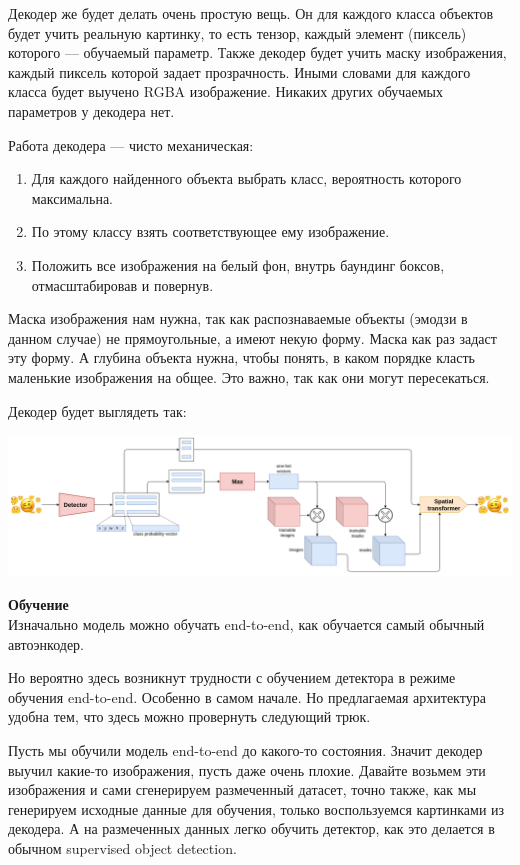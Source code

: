 \documentclass[12pt]{article}
\newenvironment{MyList}[1][4pt]{
	\begin{enumerate}[1.]
		\setlength{\parskip}{0pt}
		\setlength{\itemsep}{#1}
	}{       
	\end{enumerate}
}
\begin{document}
	Декодер же будет делать очень простую вещь. Он для каждого класса объектов будет учить реальную картинку, то есть тензор, каждый элемент (пиксель) которого --- обучаемый параметр. Также декодер будет учить маску изображения, каждый пиксель которой задает прозрачность. Иными словами для каждого класса будет выучено RGBA изображение. Никаких других обучаемых параметров у декодера нет.
	
	Работа декодера --- чисто механическая:
	\begin{MyList}
	\item Для каждого найденного объекта выбрать класс, вероятность которого максимальна.
	\item По этому классу взять соответствующее ему изображение.
	\item Положить все изображения на белый фон, внутрь баундинг боксов, отмасштабировав и повернув.
	\end{MyList}

	Маска изображения нам нужна, так как распознаваемые объекты (эмодзи в данном случае) не прямоугольные, а имеют некую форму. Маска как раз задаст эту форму. А глубина объекта нужна, чтобы понять, в каком порядке класть маленькие изображения на общее. Это важно, так как они могут пересекаться.
	
	Декодер будет выглядеть так:

	\centerline{\includegraphics[scale=0.3]{images/model_architecture_decoder.png}}	
	
	\newpage
	\textbf{Обучение}\\
	Изначально модель можно обучать end-to-end, как обучается самый обычный автоэнкодер.
	
	Но вероятно здесь возникнут трудности с обучением детектора в режиме обучения end-to-end. Особенно в самом начале. Но предлагаемая архитектура удобна тем, что здесь можно провернуть следующий трюк.
	
	Пусть мы обучили модель end-to-end до какого-то состояния. Значит декодер выучил какие-то изображения, пусть даже очень плохие. Давайте возьмем эти изображения и сами сгенерируем размеченный датасет, точно также, как мы генерируем исходные данные для обучения, только воспользуемся картинками из декодера. А на размеченных данных легко обучить детектор, как это делается в обычном supervised object detection. 
	
\end{document}
